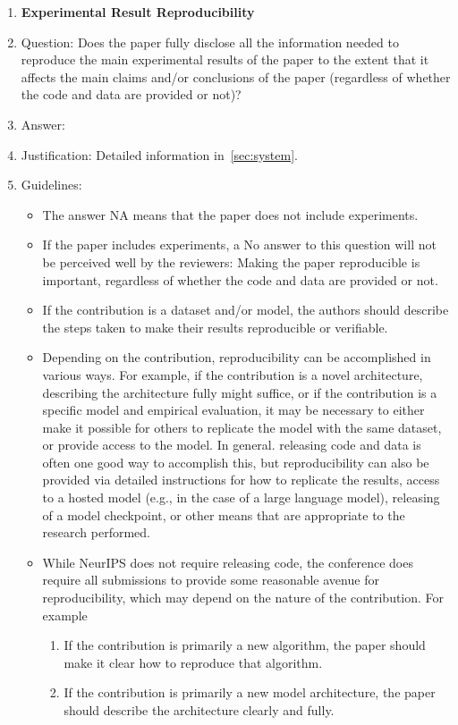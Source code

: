 \documentclass{article}
\begin{document}
{\begin{enumerate}
    \item {\bf Experimental Result Reproducibility}
    \item[] Question: Does the paper fully disclose all the information needed to reproduce the main experimental results of the paper to the extent that it affects the main claims and/or conclusions of the paper (regardless of whether the code and data are provided or not)?
    \item[] Answer: \answerYes{} %
    \item[] Justification: Detailed information in~\cref{sec:system}.
    \item[] Guidelines:
    \begin{itemize}
        \item The answer NA means that the paper does not include experiments.
        \item If the paper includes experiments, a No answer to this question will not be perceived well by the reviewers: Making the paper reproducible is important, regardless of whether the code and data are provided or not.
        \item If the contribution is a dataset and/or model, the authors should describe the steps taken to make their results reproducible or verifiable.
        \item Depending on the contribution, reproducibility can be accomplished in various ways. For example, if the contribution is a novel architecture, describing the architecture fully might suffice, or if the contribution is a specific model and empirical evaluation, it may be necessary to either make it possible for others to replicate the model with the same dataset, or provide access to the model. In general. releasing code and data is often one good way to accomplish this, but reproducibility can also be provided via detailed instructions for how to replicate the results, access to a hosted model (e.g., in the case of a large language model), releasing of a model checkpoint, or other means that are appropriate to the research performed.
        \item While NeurIPS does not require releasing code, the conference does require all submissions to provide some reasonable avenue for reproducibility, which may depend on the nature of the contribution. For example
        \begin{enumerate}
            \item If the contribution is primarily a new algorithm, the paper should make it clear how to reproduce that algorithm.
            \item If the contribution is primarily a new model architecture, the paper should describe the architecture clearly and fully.

\end{enumerate}
\end{itemize}
\end{enumerate}}
\end{document}

